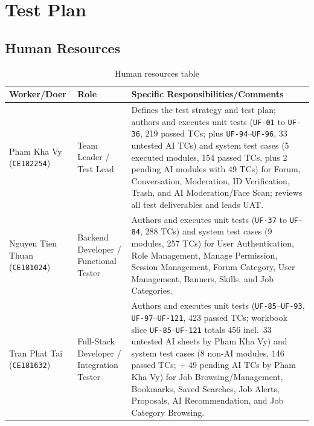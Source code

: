 \documentclass[12pt,a4paper]{article}
\renewcommand{\arraystretch}{1.35}
\newcommand{\hd}[1]{\textbf{#1}}
\begin{document}
\section{Test Plan}

\subsection{Human Resources}

\begin{table}[H]
\caption{Human resources table}
\begingroup\footnotesize\renewcommand{\arraystretch}{1.12}
\begin{tabularx}{\textwidth}{|L{4.5cm}|L{2.9cm}|Y|}
\hline
{}\hd{Worker/Doer} & \hd{Role} & \hd{Specific Responsibilities/Comments} \\ \hline
Pham Kha Vy \newline (\texttt{CE182254})  & Team Leader / \newline Test Lead & Defines the test strategy and test plan; authors and executes unit tests (\texttt{UF-01} to \texttt{UF-36}, 219 passed TCs; plus \texttt{UF-94}--\texttt{UF-96}, 33 untested AI TCs) and system test cases (5 executed modules, 154 passed TCs, plus 2 pending AI modules with 49 TCs) for Forum, Conversation, Moderation, ID Verification, Trash, and AI Moderation/Face Scan; reviews all test deliverables and leads UAT. \\ \hline
Nguyen Tien Thuan \newline (\texttt{CE181024})  & Backend Developer / \newline Functional Tester & Authors and executes unit tests (\texttt{UF-37} to \texttt{UF-84}, 288 TCs) and system test cases (9 modules, 257 TCs) for User Authentication, Role Management, Manage Permission, Session Management, Forum Category, User Management, Banners, Skills, and Job Categories. \\ \hline
Tran Phat Tai \newline (\texttt{CE181632})  & Full-Stack Developer / \newline Integration Tester & Authors and executes unit tests (\texttt{UF-85}--\texttt{UF-93}, \texttt{UF-97}--\texttt{UF-121}, 423 passed TCs; workbook slice \texttt{UF-85}--\texttt{UF-121} totals 456 incl.\ 33 untested AI sheets by Pham Kha Vy) and system test cases (8 non-AI modules, 146 passed TCs; + 49 pending AI TCs by Pham Kha Vy) for Job Browsing/Management, Bookmarks, Saved Searches, Job Alerts, Proposals, AI Recommendation, and Job Category Browsing. \\ \hline

\end{tabularx}
\end{table}
\end{document}
